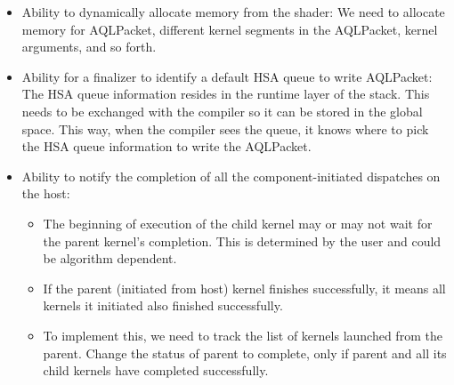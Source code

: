 \documentclass{book}
\begin{document}
\begin{appendices}
\begin{itemize}
\item Ability to dynamically allocate memory from the shader\-: We
need to allocate memory for AQL\-Packet, different kernel
segments in the AQL\-Packet, kernel arguments, and so forth.

\item Ability for a finalizer to identify a default HSA queue to
write AQL\-Packet\-: The HSA queue information resides in
the runtime layer of the stack. This needs to be exchanged with the
compiler so it can be stored in the global space. This way, when the
compiler sees the queue, it knows where to pick the HSA queue
information to write the AQL\-Packet.

\item Ability to notify the completion of all the
component-\/initiated dispatches on the host\-:

\begin{itemize}
\item The beginning of execution of the child kernel may or may not
wait for the parent kernel's completion. This is determined by the
user and could be algorithm dependent.
\item If the parent (initiated from host) kernel finishes
successfully, it means all kernels it initiated also finished
successfully.
\item To implement this, we need to track the list of kernels
launched from the parent. Change the status of parent to complete,
only if parent and all its child kernels have completed
successfully.
\end{itemize}
\end{itemize}


\end{appendices}
\end{document}
